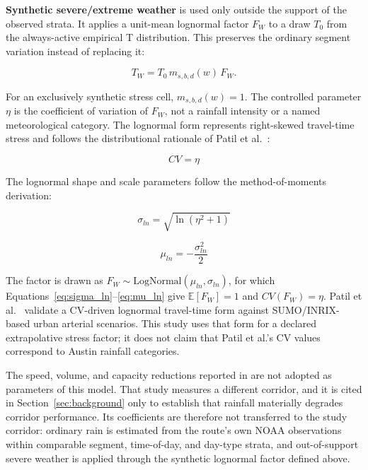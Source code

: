\textbf{Synthetic severe/extreme weather} is used only outside the support of the observed strata. It applies a unit-mean lognormal factor $F_W$ to a draw $T_0$ from the always-active empirical T distribution. This preserves the ordinary segment variation instead of replacing it:

\begin{equation}
T_W = T_0\,m_{s,b,d}(w)\,F_W.
\label{eq:weather-compose}
\end{equation}

For an exclusively synthetic stress cell, $m_{s,b,d}(w)=1$. The controlled parameter $\eta$ is the coefficient of variation of $F_W$, not a rainfall intensity or a named meteorological category. The lognormal form represents right-skewed travel-time stress and follows the distributional rationale of Patil et al.~\cite{Patil2025Conformal}:

\begin{equation} CV = \eta \label{eq:cv_eta} \end{equation}

The lognormal shape and scale parameters follow the method-of-moments derivation:

\begin{equation} \sigma_{ln} = \sqrt{\ln(\eta^2 + 1)} \label{eq:sigma_ln} \end{equation}

\begin{equation} \mu_{ln} = -\frac{\sigma_{ln}^2}{2} \label{eq:mu_ln} \end{equation}

The factor is drawn as $F_W \sim \text{LogNormal}(\mu_{ln},\sigma_{ln})$, for which Equations~\eqref{eq:sigma_ln}--\eqref{eq:mu_ln} give $\mathbb{E}[F_W]=1$ and $CV(F_W)=\eta$. Patil et al.~\cite{Patil2025Conformal} validate a CV-driven lognormal travel-time form against SUMO/INRIX-based urban arterial scenarios. This study uses that form for a declared extrapolative stress factor; it does not claim that Patil et al.'s CV values correspond to Austin rainfall categories.

The speed, volume, and capacity reductions reported in \cite{TSSP_Rain2018} are not adopted as parameters of this model. That study measures a different corridor, and it is cited in Section~\ref{sec:background} only to establish that rainfall materially degrades corridor performance. Its coefficients are therefore not transferred to the study corridor: ordinary rain is estimated from the route's own NOAA observations within comparable segment, time-of-day, and day-type strata, and out-of-support severe weather is applied through the synthetic lognormal factor defined above.

